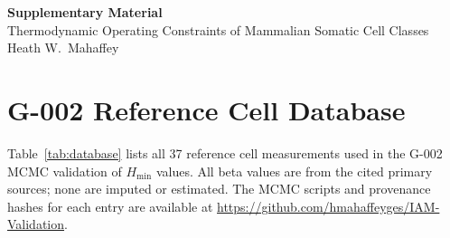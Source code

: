 \documentclass[12pt,a4paper]{article}
\newcommand{\Hmin}{H_{\min}}
\begin{document}
\begin{center}
{\large\bfseries\color{deepblue} Supplementary Material}\\[6pt]
{\normalsize Thermodynamic Operating Constraints of Mammalian Somatic Cell Classes}\\
{\small Heath W.\ Mahaffey}
\end{center}

\section{G-002 Reference Cell Database}
\label{sec:supp_database}

Table~\ref{tab:database} lists all 37 reference cell measurements used in the
G-002 MCMC validation of $\Hmin$ values. All beta values are from the cited
primary sources; none are imputed or estimated. The MCMC scripts and provenance
hashes for each entry are available at
\url{https://github.com/hmahaffeyges/IAM-Validation}.
\end{document}
